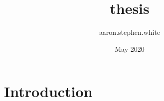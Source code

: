 \documentclass{article}
\title{thesis}
\author{aaron.stephen.white }
\date{May 2020}
\begin{document}
\maketitle

\section{Introduction}
\end{document}
